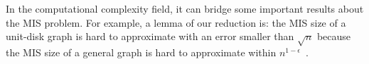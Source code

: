 \documentclass[a4paper]{article}
\newcommand{\<}{\langle}
\renewcommand{\>}{\rangle}
\begin{document}
In the computational complexity field, it can bridge some important results about the MIS problem. For example, a lemma of our reduction is: the MIS size of a unit-disk graph is hard to approximate with an error smaller than $\sqrt{n}$ because the MIS size of a general graph is hard to approximate within $n^{1-\epsilon}$~\cite{Hastad1996}.

\end{document}
